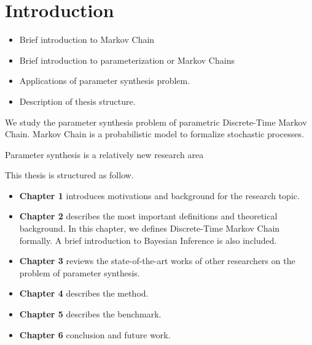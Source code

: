 \chapter{Introduction}

 {\color{red}
  \begin{itemize}
    \item Brief introduction to Markov Chain
    \item Brief introduction to parameterization or Markov Chains
    \item Applications of parameter synthesis problem.
    \item Description of thesis structure.
  \end{itemize}
 }
We study the parameter synthesis problem of parametric Discrete-Time Markov
Chain. Markov Chain is a probabilistic model to formalize stochastic
processes.

Parameter synthesis is a relatively new research area \cite{katoen2016probabilistic}

This thesis is structured as follow.

\begin{itemize}
  \item \textbf{Chapter 1} introduces motivations and background for the research topic.
  \item \textbf{Chapter 2} describes the most important definitions and
        theoretical background. In this chapter, we defines Discrete-Time Markov Chain
        formally. A brief introduction to Bayesian Inference is also included.
  \item \textbf{Chapter 3} reviews the state-of-the-art works of other researchers
        on the problem of parameter synthesis.
  \item \textbf{Chapter 4} describes the method.
  \item \textbf{Chapter 5} describes the benchmark.
  \item \textbf{Chapter 6} conclusion and future work.
\end{itemize}

